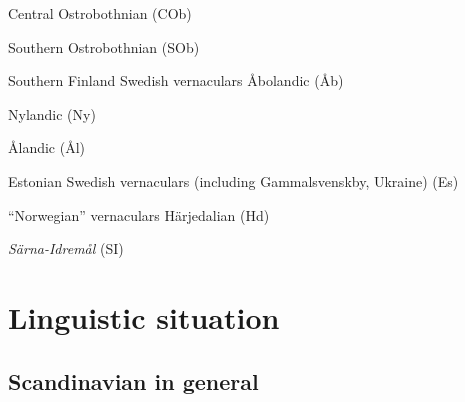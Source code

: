 Central Ostrobothnian (COb)

\item 

Southern Ostrobothnian (SOb)

\item 

Southern Finland Swedish vernaculars  Åbolandic (Åb)

\item 

Nylandic (Ny)

\item 

Ålandic (Ål)


Estonian Swedish vernaculars (including Gammalsvenskby, Ukraine) (Es)  

\item 

“Norwegian” vernaculars  Härjedalian (Hd)

\item 

\textit{Särna-Idremål} (SI)

\section{ }

\section{ Linguistic situation}
\subsection{ Scandinavian in general}

